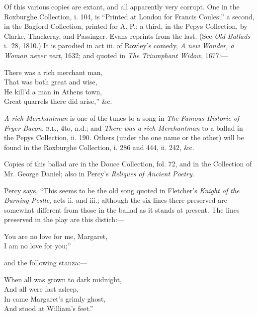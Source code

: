 Of this various copies are extant, and all apparently very corrupt. One in the
Roxburghe Collection, i. 104, is “Printed at London for Francis Coules;”
a second, in the Bagford Collection, printed for A. P.; a third, in the Pepys
Collection, by Clarke, Thackeray, and Passinger. Evans reprints from the last.
\pagebreak%
(See \textit{Old Ballads} i.~28, 1810.) It is parodied in act iii. of Rowley’s comedy,
\textit{A new Wonder, a Woman never vext}, 1632; and quoted in\textit{ The Triumphant
Widow}, 1677:—
\settowidth{\versewidth}{There was a rich merchant man,}
\begin{dcverse}\begin{altverse}
There was a rich merchant man,\\
That was both great and wise,\\
He kill’d a man in Athens town,\\
Great quarrels there did arise,” \&c.
\end{altverse}
\end{dcverse}


\textit{A rich Merchantman} is one of the tunes to a song in \textit{The Famous Historie of
Fryer Bacon}, \textsc{b.l.}, 4to, n.d.; and \textit{There was a rich Merchantman} to a ballad in
the Pepys Collection, ii. 190. Others (under the one name or the other) will
be found in the Roxburghe Collection, i. 286 and 444, ii. 242, \&c.



Copies of this ballad are in the Douce Collection, fol. 72, and in the Collection
of Mr. George Daniel; also in Percy’s \textit{Reliques of Ancient Poetry}.

Percy says, “This seems to be the old song quoted in Fletcher’s \textit{Knight of the
Burning Pestle}, acts ii. and iii.; although the six lines there preserved are somewhat
different from those in the ballad as it stands at present. The lines preserved
in the play are this distich:—
\settowidth{\versewidth}{You are no love for me, Margaret,}
\begin{scverse}
You are no love for me, Margaret,\\
I am no love for you;”
\end{scverse}
and the following stanza:—
\settowidth{\versewidth}{In came Margaret’s grimly ghost,}
\begin{dcverse}\begin{altverse}
When all was grown to dark midnight,\\
And all were fast asleep,\\
In came Margaret’s grimly ghost,\\
And stood at William’s feet.”
\end{altverse}
\end{dcverse}

